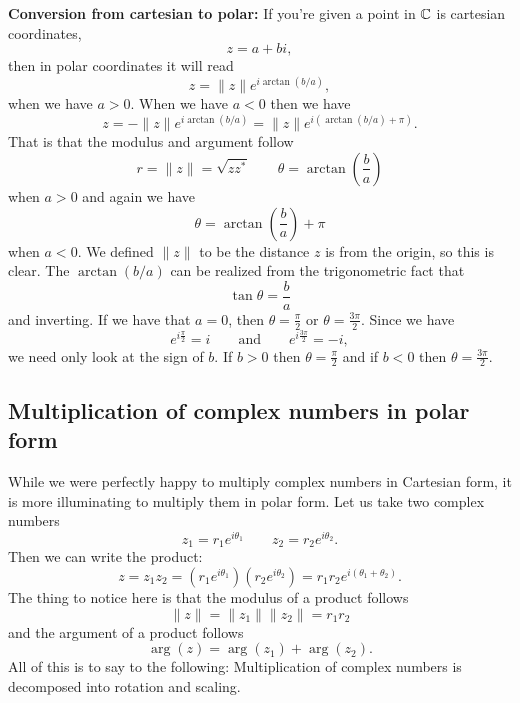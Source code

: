         \noindent \textbf{\textbf{Conversion from cartesian to polar:}} If you're given a point in $\mathbb{C}$ is cartesian coordinates,
        \[
        z=a+bi,
        \]
        then in polar coordinates it will read
        \[
        z=\|z\|e^{i\arctan(b/a)},
        \]
        when we have $a>0$. When we have $a<0$ then we have
        \[
        z=-\|z\|e^{i\arctan(b/a)}=\|z\|e^{i(\arctan(b/a)+\pi)}.
        \]
        That is that the modulus and argument follow
        \[
        r = \|z\|=\sqrt{zz^*} \qquad \theta = \arctan\left( \frac{b}{a}\right)
        \]
        when $a>0$ and again we have
        \[
        \theta = \arctan\left(\frac{b}{a}\right)+\pi
        \]
        when $a<0$. We defined $\|z\|$ to be the distance $z$ is from the origin, so this is clear.  The $\arctan(b/a)$ can be realized from the trigonometric fact that
        \[
        \tan \theta = \frac{b}{a}
        \]
        and inverting. If we have that $a=0$, then $\theta=\frac{\pi}{2}$ or $\theta=\frac{3\pi}{2}$. Since we have
        \[
        e^{i\frac{\pi}{2}}=i \qquad \textrm{and} \qquad e^{i\frac{3\pi}{2}}=-i,
        \]
        we need only look at the sign of $b$.  If $b>0$ then $\theta=\frac{\pi}{2}$ and if $b<0$ then $\theta=\frac{3\pi}{2}$.
        
        
        \subsection{Multiplication of complex numbers in polar form}
        
        While we were perfectly happy to multiply complex numbers in Cartesian form, it is more illuminating to multiply them in polar form.  Let us take two complex numbers
        \[
        z_1 = r_1 e^{i\theta_1} \qquad z_2 = r_2 e^{i\theta_2}.
        \]
        Then we can write the product:
        \[
        z=z_1 z_2 = (r_1 e^{i\theta_1})(r_2 e^{i\theta_2})= r_1r_2 e^{i(\theta_1+\theta_2)}.
        \]
        The thing to notice here is that the modulus of a product follows
        \[
        \|z\|=\|z_1\|\|z_2\|=r_1r_2
        \]
        and the argument of a product follows
        \[
        \arg(z)=\arg(z_1)+\arg(z_2).
        \]
        All of this is to say to the following: Multiplication of complex numbers is decomposed into rotation and scaling. 
        
